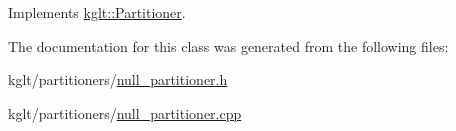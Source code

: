 Implements \hyperlink{classkglt_1_1_partitioner_ad5fec2d4fd9ee3eee608799f700808b7}{kglt\-::\-Partitioner}.



The documentation for this class was generated from the following files\-:\begin{DoxyCompactItemize}
\item 
kglt/partitioners/\hyperlink{null__partitioner_8h}{null\-\_\-partitioner.\-h}\item 
kglt/partitioners/\hyperlink{null__partitioner_8cpp}{null\-\_\-partitioner.\-cpp}\end{DoxyCompactItemize}
